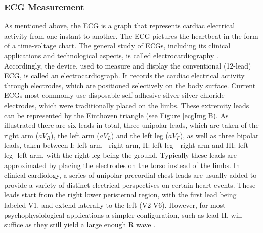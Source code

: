 \subsubsection{ECG Measurement}
As mentioned above, the ECG is a graph that represents cardiac electrical activity from one instant to another. The ECG pictures the heartbeat in the form of a time-voltage chart. The general study of ECGs, including its clinical applications and technological aspects, is called electrocardiography \cite{GOLDBERGER2017}. Accordingly, the device, used to measure and display the conventional (12-lead) ECG, is called an electrocardiograph. It records the cardiac electrical activity through electrodes, which are positioned selectively on the body surface. Current ECGs most commonly use disposable self-adhesive silver-silver chloride electrodes, which were traditionally placed on the limbs. These extremity leads can be represented by the Einthoven triangle (see Figure \ref{ecgImg}B). As illustrated there are six leads in total, three unipolar leads, which are taken of the right arm ($aV_{R}$), the left arm ($aV_{L}$) and the left leg ($aV_{F}$), as well as three bipolar leads, taken between I: left arm - right arm, II: left leg - right arm and III: left leg -left arm, with the right leg being the ground. Typically these leads are approximated by placing the electrodes on the torso instead of the limbs. In clinical cardiology, a series of unipolar precordial chest leads are usually added to provide a variety of distinct electrical perspectives on certain heart events. These leads start from the right lower peristernal region, with the first lead being labeled V1, and extend laterally to the left (V2-V6). However, for most psychophysiological applications a simpler configuration, such as lead II, will suffice as they still yield a large enough R wave \citep{HANDBOOKPP}. 

